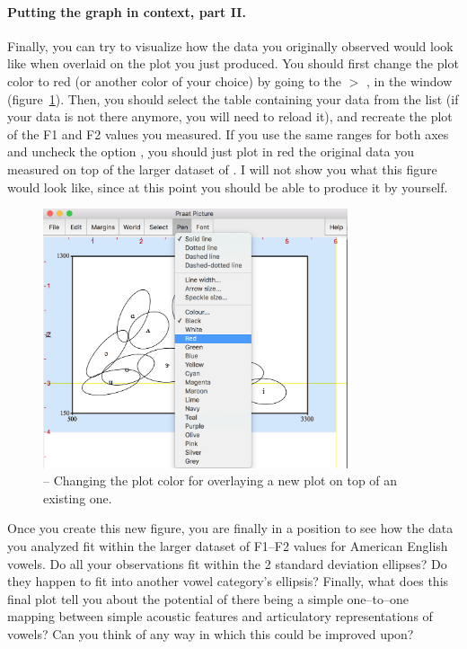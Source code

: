 \paragraph{Putting the graph in context, part II.} Finally, you can try to visualize how the data you originally observed would look like when overlaid on the plot you just produced. You should first change the plot color to red (or another color of your choice) by going to the  $>$ , in the  window (figure~\ref{praat-change-color}). Then, you should select the table containing your data from the  list (if your data is not there anymore, you will need to reload it), and recreate the plot of the F1 and F2 values you measured. If you use the same ranges for both axes and uncheck the option , you should just plot in red the original data you measured on top of the larger dataset of . I will not show you what this figure would look like, since at this point you should be able to produce it by yourself.


\begin{figure}[!tbp]
\caption{\Praat{} -- Changing the plot color for overlaying a new plot on top of an existing one.}
\label{praat-change-color}
	\begin{center}
		\includegraphics[width=0.8\textwidth]{./figures/Praat-25-Change-color}
	\end{center}
\end{figure}

Once you create this new figure, you are finally in a position to see how the data you analyzed fit within the larger dataset of F1--F2 values for American English vowels. Do all your observations fit within the 2 standard deviation ellipses? Do they happen to fit into another vowel category's ellipsis? Finally, what does this final plot tell you about the potential of there being a simple one--to--one mapping between simple acoustic features and articulatory representations of vowels? Can you think of any way in which this could be improved upon?

